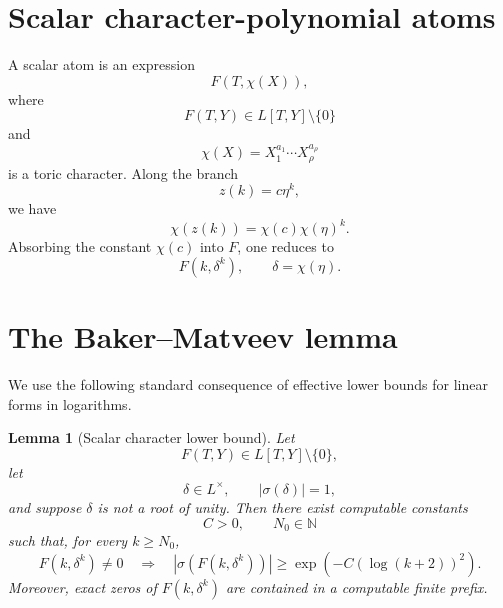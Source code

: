 \documentclass[11pt]{article}
\newtheorem{lemma}[theorem]{Lemma}
\begin{document}
\section{Scalar character-polynomial atoms}

A scalar atom is an expression
\[
F(T,\chi(X)),
\]
where
\[
F(T,Y)\in L[T,Y]\setminus\{0\}
\]
and
\[
\chi(X)=X_1^{a_1}\cdots X_\rho^{a_\rho}
\]
is a toric character. Along the branch
\[
z(k)=c\eta^k,
\]
we have
\[
\chi(z(k))=\chi(c)\chi(\eta)^k.
\]
Absorbing the constant \(\chi(c)\) into \(F\), one reduces to
\[
F(k,\delta^k),
\qquad
\delta=\chi(\eta).
\]

\section{The Baker--Matveev lemma}

We use the following standard consequence of effective lower bounds for linear forms in logarithms.

\begin{lemma}[Scalar character lower bound]
Let
\[
F(T,Y)\in L[T,Y]\setminus\{0\},
\]
let
\[
\delta\in L^\times,
\qquad
|\sigma(\delta)|=1,
\]
and suppose \(\delta\) is not a root of unity. Then there exist computable constants
\[
C>0,
\qquad
N_0\in\mathbb N
\]
such that, for every \(k\ge N_0\),
\[
F(k,\delta^k)\ne0
\quad\Longrightarrow\quad
|\sigma(F(k,\delta^k))|
\ge
\exp(-C(\log(k+2))^2).
\]
Moreover, exact zeros of \(F(k,\delta^k)\) are contained in a computable finite prefix.
\end{lemma}
\end{document}
